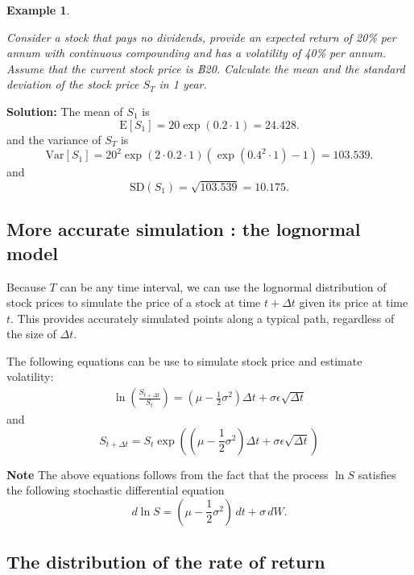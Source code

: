 \documentclass[landscape, 20pt]{extreport}
\theoremstyle{definition}
\theoremstyle{definition}
\newtheorem{example}{Example}[chapter]
\theoremstyle{definition}
\theoremstyle{definition}
\theoremstyle{remark}
\begin{document}
\newpage \begin{example}
\protect\hypertarget{exm:unlabeled-div-74}{}\label{exm:unlabeled-div-74}

\emph{Consider a stock that pays no dividends, provide an
expected return of 20\% per annum with continuous compounding and has a
volatility of 40\% per annum. Assume that the current stock price is ฿20.
Calculate the mean and the standard deviation of the stock price \(S_T\)
in 1 year.}

\end{example}

\textbf{Solution:} The mean of \(S_1\) is
\[\mathrm{E}[S_1] =  20 \exp (0.2 \cdot 1)  = 24.428.\] and the variance
of \(S_T\) is
\[\mathrm{Var}[S_1] = 20^2 \exp(2 \cdot 0.2 \cdot 1) (\exp(0.4^2 \cdot 1) - 1) = 103.539.\]
and \[\text{SD}(S_1) = \sqrt{ 103.539} = 10.175.\]

\hypertarget{more-accurate-simulation-the-lognormal-model}{%
\subsection{More accurate simulation : the lognormal model}\label{more-accurate-simulation-the-lognormal-model}}

Because \(T\) can be any time interval, we can use the lognormal
distribution of stock prices to simulate the price of a stock at time
\(t + \Delta t\) given its price at time \(t\). This provides accurately
simulated points along a typical path, regardless of the size of
\(\Delta t\).

The following equations can be use to simulate stock price and estimate
volatility: \[\begin{aligned}
 \label{lognormalModel}
\ln\left(  \frac{S_{t+\Delta t}}{S_t} \right) = (\mu - \frac{1}{2}\sigma^2 )\Delta t + \sigma \epsilon \sqrt{\Delta t}\end{aligned}\]
and
\[S_{t+ \Delta t}  = S_t \exp(   (\mu - \frac{1}{2}\sigma^2 )\Delta t + \sigma \epsilon \sqrt{\Delta t}  )\]

\textbf{Note} The above equations follows from the fact that the process
\(\ln S\) satisfies the following stochastic differential equation
\[d \ln S =  (\mu - \frac{1}{2}\sigma^2 ) \, dt + \sigma \, d W.\]

\hypertarget{the-distribution-of-the-rate-of-return}{%
\subsection{The distribution of the rate of return}\label{the-distribution-of-the-rate-of-return}}
\end{document}
